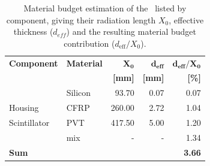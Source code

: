 \documentclass[../BTOF_summary.tex]{subfiles}
\begin{document}
\begin{table}[htbp]
	\centering
	\caption[Material budget estimation of the \btofLong .]{Material budget estimation of the \btofLong\ listed by component, giving their radiation length $X_0$, effective thickness ($d_{eff}$) and the resulting material budget contribution ($d_{\text{eff}} / X_0$).}
	\label{tab:MaterialBudget_total}
	\begin{tabular}{@{}llrrr@{}}
		\toprule
		\textbf{Component} & \textbf{Material} & $\mathbf{X_0}$ & $\mathbf{d_{eff}}$ & $\mathbf{d_{eff}/X_{0}}$ \\
		&    & \textbf{[mm]}  & \textbf{[mm]} & \textbf{[\%]}  \\ \midrule
		\sipms       & Silicon & 93.70  & 0.07 & 0.07  \\
		Housing      & CFRP    & 260.00 & 2.72 & 1.04  \\
		Scintillator & PVT     & 417.50 & 5.00 & 1.20  \\
		\railboard   & mix     & -      & -    & 1.34  \\ \midrule
		\textbf{Sum}       &				      &                &                    & \textbf{3.66}            \\ \bottomrule
	\end{tabular}
\end{table}
\end{document}
